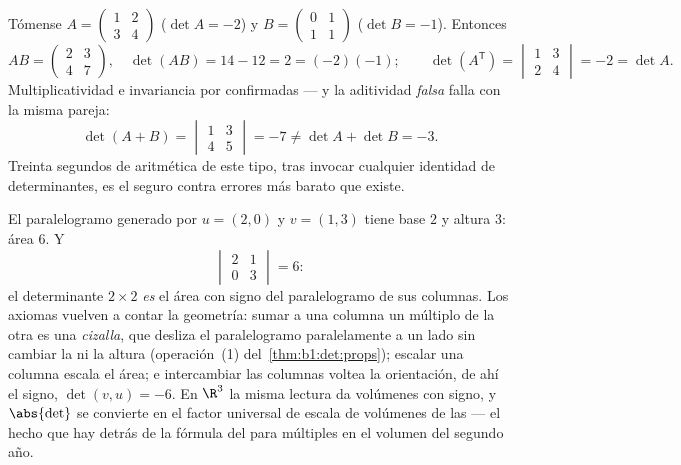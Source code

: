\begin{example}
\label{ex:b1:det:rulescheck}
Tómense $A = \begin{pmatrix} 1 & 2\\ 3 & 4\end{pmatrix}$
($\det A = -2$) y
$B = \begin{pmatrix} 0 & 1\\ 1 & 1\end{pmatrix}$ ($\det B = -1$).
Entonces
\[
AB = \begin{pmatrix} 2 & 3\\ 4 & 7\end{pmatrix},
\quad \det(AB) = 14 - 12 = 2 = (-2)(-1) ;
\qquad
\det(A^{\mathsf T}) = \begin{vmatrix} 1 & 3\\ 2 & 4
\end{vmatrix} = -2 = \det A .
\]
Multiplicatividad e invariancia por  confirmadas --- y la
aditividad \emph{falsa} falla con la misma pareja:
\[
\det(A + B) = \begin{vmatrix} 1 & 3\\ 4 & 5\end{vmatrix} = -7
\neq \det A + \det B = -3 .
\]
Treinta segundos de aritmética de este tipo, tras invocar cualquier
identidad de determinantes, es el seguro contra errores más barato
que existe.
\end{example}

\begin{example}
\label{ex:b1:det:area}
El paralelogramo generado por $u = (2, 0)$ y $v = (1, 3)$ tiene base
$2$ y altura $3$: área $6$. Y
\[
\begin{vmatrix} 2 & 1\\ 0 & 3\end{vmatrix} = 6 :
\]
el determinante $2\times2$ \emph{es} el área con signo del
paralelogramo de sus columnas. Los axiomas vuelven a contar la
geometría: sumar a una columna un múltiplo de la otra es una
\emph{cizalla}, que desliza el paralelogramo paralelamente a un lado
sin cambiar la  ni la altura (operación~(1)
del~\cref{thm:b1:det:props}); escalar una columna escala el área; e
intercambiar las columnas voltea la orientación, de ahí el signo,
$\det(v, u) = -6$. En $\R^3$ la misma lectura da volúmenes con signo,
y $\abs{\det}$ se convierte en el factor universal de escala de
volúmenes de las  --- el hecho que hay detrás de
la fórmula del  para  múltiples en el
volumen del segundo año.
\end{example}

